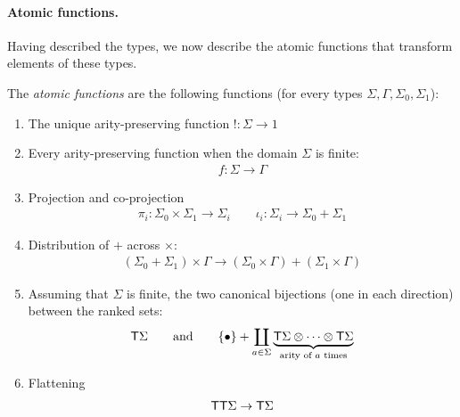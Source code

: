 \paragraph*{Atomic functions.} Having described the types, we now describe the atomic functions that transform elements of these types.




\begin{definition}\label{def:atomic-functions} The \emph{atomic functions} are the following functions (for every types $\Sigma,\Gamma,\Sigma_0,\Sigma_1$): 
\begin{enumerate}
    \item The unique arity-preserving function $! : \Sigma \to 1$
    \item Every arity-preserving function when the domain $\Sigma$ is finite:
    \begin{align*}
        f : \Sigma \to \Gamma
    \end{align*}
    \item Projection and co-projection
    \begin{align*}
        \pi_i : \Sigma_0 \times \Sigma_1 \to \Sigma_i \qquad \iota_i : \Sigma_i \to \Sigma_0 + \Sigma_1
    \end{align*}
    \item Distribution of $+$ across $\times$:
\begin{align*}
    (\Sigma_0 + \Sigma_1 ) \times \Gamma \to (\Sigma_0 \times \Gamma) + (\Sigma_1 \times \Gamma)
\end{align*}
\item Assuming that $\Sigma$ is finite, the two canonical bijections (one in each direction) between the ranked sets:
 \begin{align*}
    \mathsf T \Sigma \qquad \text{and} \qquad    \{\bullet\} + \coprod_{a \in \Sigma} \underbrace{\mathsf T \Sigma \otimes \cdots \otimes \mathsf T \Sigma}_{\text{arity of $a$ times}}
\end{align*}

\item Flattening
\begin{align*}
    \mathsf T \mathsf T \Sigma \to \mathsf T \Sigma
\end{align*}



\end{enumerate}
\end{definition}
